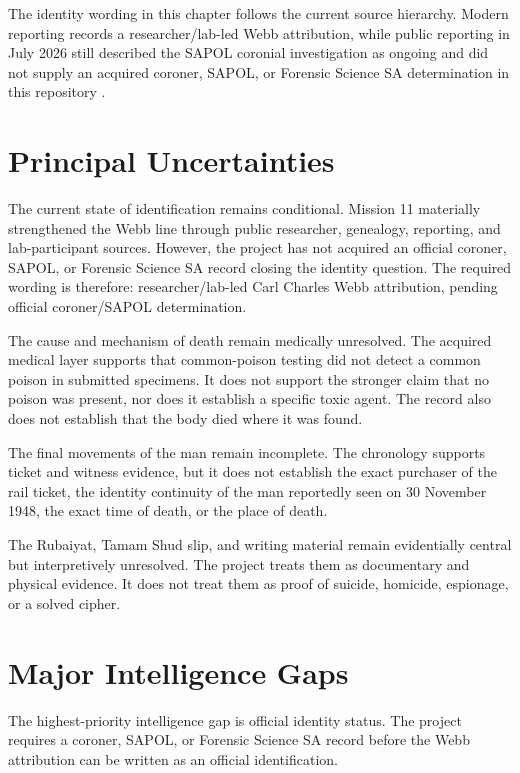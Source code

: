 The identity wording in this chapter follows the current source hierarchy. Modern reporting records a researcher/lab-led Webb attribution, while public reporting in July 2026 still described the SAPOL coronial investigation as ongoing and did not supply an acquired coroner, SAPOL, or Forensic Science SA determination in this repository \parencite{m11-m11-src-0001,m11-m11-src-0003}.

\section{Principal Uncertainties}

The current state of identification remains conditional. Mission 11 materially strengthened the Webb line through public researcher, genealogy, reporting, and lab-participant sources. However, the project has not acquired an official coroner, SAPOL, or Forensic Science SA record closing the identity question. The required wording is therefore: researcher/lab-led Carl Charles Webb attribution, pending official coroner/SAPOL determination.

The cause and mechanism of death remain medically unresolved. The acquired medical layer supports that common-poison testing did not detect a common poison in submitted specimens. It does not support the stronger claim that no poison was present, nor does it establish a specific toxic agent. The record also does not establish that the body died where it was found.

The final movements of the man remain incomplete. The chronology supports ticket and witness evidence, but it does not establish the exact purchaser of the rail ticket, the identity continuity of the man reportedly seen on 30 November 1948, the exact time of death, or the place of death.

The Rubaiyat, Tamam Shud slip, and writing material remain evidentially central but interpretively unresolved. The project treats them as documentary and physical evidence. It does not treat them as proof of suicide, homicide, espionage, or a solved cipher.

\section{Major Intelligence Gaps}

The highest-priority intelligence gap is official identity status. The project requires a coroner, SAPOL, or Forensic Science SA record before the Webb attribution can be written as an official identification.

